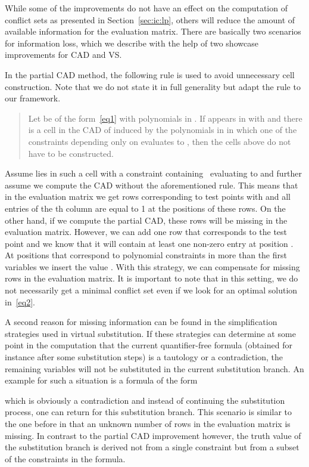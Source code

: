 \documentclass{llncs}
\begin{document}
While some of the improvements do not have an effect on the computation of
conflict sets as presented in Section~\ref{sec:ic:lp}, others will reduce the
amount of available information for the evaluation matrix. There are basically
two scenarios for information loss, which we describe with the help of two
showcase improvements for CAD and VS.

In the partial CAD method, the following rule is used to avoid unnecessary cell
construction. Note that we do not state it in full generality but adapt the rule
to our framework.

\begin{quote}
  Let  be of the form~\eqref{eq1} with polynomials in . If  appears in 
  with  and there is a cell  in the CAD of 
  induced by the polynomials in  in which one of the constraints
  depending only on  evaluates to , then the cells
  above  do not have to be constructed.
\end{quote}

Assume  lies in such a cell with a
constraint containing~ evaluating to  and further
assume we compute the CAD without the aforementioned rule. This means
that in the evaluation matrix we get  rows corresponding to test
points  with  and all entries
of the th column are equal to 1 at the positions of these rows.
On the other hand, if we compute the partial CAD, these rows will be
missing in the evaluation matrix. However, we can add one row that
corresponds to the test point  and we know that it
will contain at least one non-zero entry at position . At
positions that correspond to polynomial constraints in more than the
first  variables we insert the value .
With this strategy, we can compensate for missing rows in the
evaluation matrix. It is important to note that in this setting, we do
not necessarily get a minimal conflict set even if we look for an
optimal solution in~\eqref{eq2}.

A second reason for missing information can be found in the
simplification strategies used in virtual substitution. If these
strategies can determine at some point in the computation that the
current quantifier-free formula (obtained for instance after some
substitution steps) is a tautology or a contradiction, the remaining
variables will not be substituted in the current substitution
branch. An example for such a situation is a formula of the form

which is obviously a contradiction and instead of continuing the substitution
process, one can return  for this substitution branch.
This scenario is similar to the one before in that an unknown number of
rows in the evaluation matrix is missing. In contrast to the partial
CAD improvement however, the truth value of the substitution branch is
derived not from a single constraint but from a subset of the
constraints in the formula.
\end{document}
